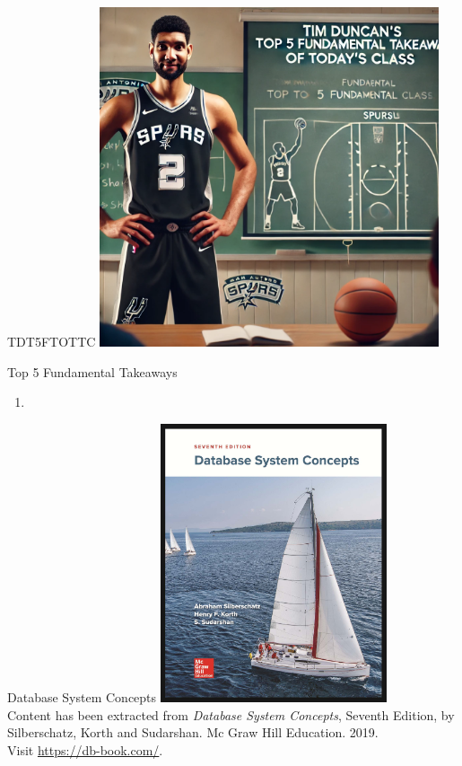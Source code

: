 \documentclass{beamer}
\begin{document}
\begin{frame}{TDT5FTOTTC}
    \centering
    \includegraphics[width=0.75\textwidth]{figures/tim.png}
\end{frame}

\begin{frame}{Top 5 Fundamental Takeaways}
    \small
    \begin{enumerate}
        \item[5]
    \end{enumerate}
\end{frame}

\begin{frame}{Database System Concepts}
    \centering
    \includegraphics[width=0.5\textwidth]{figures/book_cover.jpg} \\
    \vspace{5mm}
    {
        \tiny
        Content has been extracted from \textit{Database System Concepts}, Seventh Edition, by Silberschatz, Korth and Sudarshan. Mc Graw Hill Education. 2019.\\
        Visit \url{https://db-book.com/}.\\
    }
\end{frame}
\end{document}

